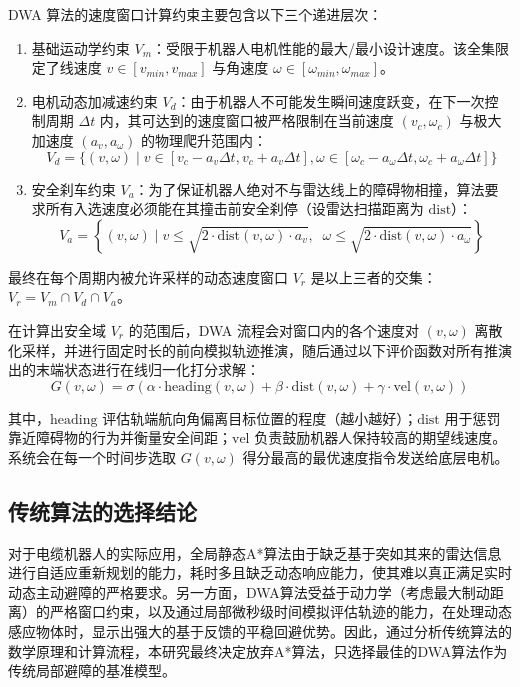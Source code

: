DWA 算法的速度窗口计算约束主要包含以下三个递进层次：
\begin{enumerate}
    \item 基础运动学约束 $V_m$：受限于机器人电机性能的最大/最小设计速度。该全集限定了线速度 $v \in [v_{min}, v_{max}]$ 与角速度 $\omega \in [\omega_{min}, \omega_{max}]$。
    \item 电机动态加减速约束 $V_d$：由于机器人不可能发生瞬间速度跃变，在下一次控制周期 $\Delta t$ 内，其可达到的速度窗口被严格限制在当前速度 $(v_c, \omega_c)$ 与极大加速度 $(a_v, a_\omega)$ 的物理爬升范围内：
    \begin{equation}
        V_d = \{ (v, \omega) \mid v \in [v_c - a_v \Delta t, v_c + a_v \Delta t], \omega \in [\omega_c - a_\omega \Delta t, \omega_c + a_\omega \Delta t] \}
    \end{equation}
    \item 安全刹车约束 $V_a$：为了保证机器人绝对不与雷达线上的障碍物相撞，算法要求所有入选速度必须能在其撞击前安全刹停（设雷达扫描距离为 $\text{dist}$）：
    \begin{equation}
        V_a = \left\{ (v, \omega) \mid v \le \sqrt{2 \cdot \text{dist}(v, \omega) \cdot a_v}, \;\; \omega \le \sqrt{2 \cdot \text{dist}(v, \omega) \cdot a_\omega} \right\}
    \end{equation}
\end{enumerate}

最终在每个周期内被允许采样的动态速度窗口 $V_r$ 是以上三者的交集：$V_r = V_m \cap V_d \cap V_a$。

在计算出安全域 $V_r$ 的范围后，DWA 流程会对窗口内的各个速度对 $(v, \omega)$ 离散化采样，并进行固定时长的前向模拟轨迹推演，随后通过以下评价函数对所有推演出的末端状态进行在线归一化打分求解：
\begin{equation}
    G(v, \omega) = \sigma \left( \alpha \cdot \text{heading}(v, \omega) + \beta \cdot \text{dist}(v, \omega) + \gamma \cdot \text{vel}(v, \omega) \right)
\end{equation}

其中，$\text{heading}$ 评估轨端航向角偏离目标位置的程度（越小越好）；$\text{dist}$ 用于惩罚靠近障碍物的行为并衡量安全间距；$\text{vel}$ 负责鼓励机器人保持较高的期望线速度。系统会在每一个时间步选取 $G(v, \omega)$ 得分最高的最优速度指令发送给底层电机。
\subsection{传统算法的选择结论}

对于电缆机器人的实际应用，全局静态A*算法由于缺乏基于突如其来的雷达信息进行自适应重新规划的能力，耗时多且缺乏动态响应能力，使其难以真正满足实时动态主动避障的严格要求。另一方面，DWA算法受益于动力学（考虑最大制动距离）的严格窗口约束，以及通过局部微秒级时间模拟评估轨迹的能力，在处理动态感应物体时，显示出强大的基于反馈的平稳回避优势\cite{gong2024local,jin2023robot}。因此，通过分析传统算法的数学原理和计算流程，本研究最终决定放弃A*算法，只选择最佳的DWA算法作为传统局部避障的基准模型。
